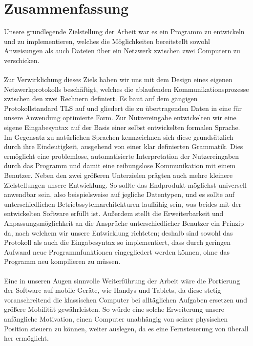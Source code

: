 %

%
\section{Zusammenfassung}
Unsere grundlegende Zielstellung der Arbeit war es ein Programm zu entwickeln und zu implementieren, welches die Möglichkeiten bereitstellt sowohl Anweisungen als auch Dateien über ein Netzwerk zwischen zwei Computern zu verschicken.\\\\
Zur Verwirklichung dieses Ziels haben wir uns mit dem Design eines eigenen Netzwerkprotokolls beschäftigt, welches die ablaufenden Kommunikationsprozesse zwischen den zwei Rechnern definiert. 
Es baut auf dem gängigen Protokollstandard TLS auf und gliedert die zu übertragenden Daten in eine für unsere Anwendung optimierte Form. 
Zur Nutzereingabe entwickelten wir eine eigene Eingabesyntax auf der Basis einer selbst entwickelten formalen Sprache. 
Im Gegensatz zu natürlichen Sprachen kennzeichnen sich diese grundsätzlich durch ihre Eindeutigkeit, ausgehend von einer klar definierten Grammatik. 
Dies ermöglicht eine problemlose, automatisierte Interpretation der Nutzereingaben durch das Programm und damit eine reibungslose Kommunikation mit einem Benutzer.
Neben den zwei größeren Unterzielen prägten auch mehre kleinere Zielstellungen unsere Entwicklung.
So sollte das Endprodukt möglichst universell anwendbar sein, also beispielsweise auf jegliche Datentypen, und es sollte auf unterschiedlichen Betriebssytemarchitekturen lauffähig sein, was beides mit der entwickelten Software erfüllt ist.
Außerdem stellt die Erweiterbarkeit und Anpassungsmöglichkeit an die Ansprüche unterschiedlicher Benutzer ein Prinzip da, nach welchem wir unsere Entwicklung richteten; deshalb sind sowohl das Protokoll als auch die Eingabesyntax so implementiert, dass durch geringen Aufwand neue Programmfunktionen eingegliedert werden können, ohne das Programm neu kompilieren zu müssen.\\\\
Eine in unseren Augen sinnvolle Weiterführung der Arbeit wäre die Portierung der Software auf mobile Geräte, wie Handys und Tablets, da diese stetig voranschreitend die klassischen Computer bei alltäglichen Aufgaben ersetzen und größere Mobilität gewährleisten. 
So würde eine solche Erweiterung unsere anfängliche Motivation, einen Computer unabhängig von seiner physischen Position steuern zu können, weiter auslegen, da es eine Fernsteuerung von überall her ermöglicht. 
